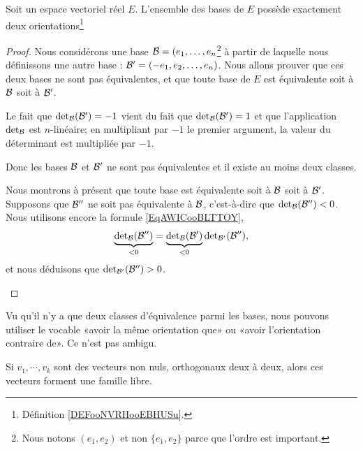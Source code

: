 \begin{lemma}
    Soit un espace vectoriel réel \( E\). L'ensemble des bases de \( E\) possède exactement deux orientations\footnote{Définition \ref{DEFooNVRHooEBHUSu}.}
\end{lemma}

\begin{proof}
    Nous considérons une base \( \mathcal{B}=(e_1,\ldots, e_n\)\footnote{Nous notons \( (e_1,e_2)\) et non \( \{ e_1,e_2 \}\) parce que l'ordre est important.} à partir de laquelle nous définissons une autre base : \( \mathcal{B}'=( -e_1,e_2,\ldots, e_n )\). Nous allons prouver que ces deux bases ne sont pas équivalentes, et que toute base de \( E\) est équivalente soit à \( \mathcal{B}\) soit à \( \mathcal{B}'\).

    \begin{subproof}
        \item[Au moins deux classes]
            Le fait que \( \mathop{\mathrm{det}}\nolimits_{\mathcal{B}}(\mathcal{B}')=-1\) vient du fait que \( \mathop{\mathrm{det}}\nolimits_{\mathcal{B}}(\mathcal{B}')=1\) et que l'application \( \mathop{\mathrm{det}}\nolimits_{\mathcal{B}}\) est \( n\)-linéaire; en multipliant par \( -1\) le premier argument, la valeur du déterminant est multipliée par \( -1\).

            Donc les bases \( \mathcal{B}\) et \( \mathcal{B}'\) ne sont pas équivalentes et il existe au moins deux classes.

        \item[Au plus deux classes]
            Nous montrons à présent que toute base est équivalente soit à \( \mathcal{B}\) soit à \( \mathcal{B}'\). Supposons que \( \mathcal{B}''\) ne soit pas équivalente à \( \mathcal{B}\), c'est-à-dire que \( \mathop{\mathrm{det}}\nolimits_{\mathcal{B}}(\mathcal{B}'')<0\). Nous utilisons encore la formule \eqref{EqAWICooBLTTOY},
            \begin{equation}
                \underbrace{\mathop{\mathrm{det}}\nolimits_{\mathcal{B}}(\mathcal{B}'')}_{<0}=\underbrace{\mathop{\mathrm{det}}\nolimits_{\mathcal{B}}(\mathcal{B}')}_{<0}\mathop{\mathrm{det}}\nolimits_{\mathcal{B}'}(\mathcal{B}''),
            \end{equation}
            et nous déduisons que \( \mathop{\mathrm{det}}\nolimits_{\mathcal{B}'}(\mathcal{B}'')>0\).
    \end{subproof}
\end{proof}

\begin{normaltext}
    Vu qu'il n'y a que deux classes d'équivalence parmi les bases, nous pouvons utiliser le vocable «avoir la même orientation que» ou «avoir l'orientation contraire de». Ce n'est pas ambigu.
\end{normaltext}


\begin{proposition}			\label{PropVectsOrthLibres}
	Si $v_1,\cdots,v_k$ sont des vecteurs non nuls, orthogonaux deux à deux, alors ces vecteurs forment une famille libre.
\end{proposition}
	

